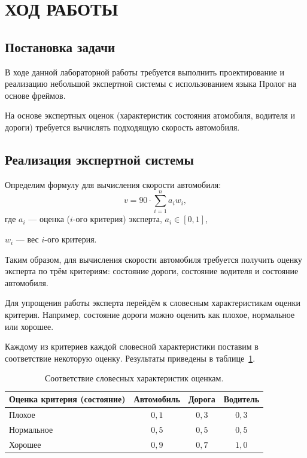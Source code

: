 \section{ХОД РАБОТЫ}

\subsection{Постановка задачи}

В ходе данной лабораторной работы требуется выполнить проектирование
и реализацию небольшой экспертной системы с использованием языка Пролог
на основе фреймов.

На основе экспертных оценок (характеристик состояния атомобиля,
водителя и дороги) требуется вычислять подходящую скорость автомобиля.


\subsection{Реализация экспертной системы}

Определим формулу для вычисления скорости автомобиля:
\begin{equation*}
  v = 90 \cdot \sum_{i = 1}^n a_i w_i,
\end{equation*}
где \hspace{2mm} $a_i$ --- оценка ($i$-ого критерия) эксперта, $ a_i \in [0,1] $, \par
$w_i$ --- вес $i$-ого критерия.

Таким образом, для вычисления скорости автомобиля требуется получить оценку
эксперта по трём критериям: состояние дороги, состояние водителя и состояние автомобиля. 

Для упрощения работы эксперта перейдём к словесным характеристикам оценки критерия.
Например, состояние дороги можно оценить как плохое, нормальное или хорошее.

Каждому из критериев каждой словесной характеристики поставим в
соответствие некоторую оценку. Результаты приведены в таблице~\ref{tbl:evals}.
\begin{table}[h!]
  \caption{Соответствие словесных характеристик оценкам.}
  \label{tbl:evals}
  \begin{tabular}{| p{85mm} | c | c | c |}
    \hline
    
    Оценка критерия (состояние) &
    Автомобиль &
    Дорога &
    Водитель \\
    \hline
    
    Плохое      & $0{,}1$ & $0{,}3$ & $0{,}3$ \\ \hline
    Нормальное  & $0{,}5$ & $0{,}5$ & $0{,}5$ \\ \hline
    Хорошее     & $0{,}9$ & $0{,}7$ & $1{,}0$ \\
    \hline
  \end{tabular}
\end{table}

